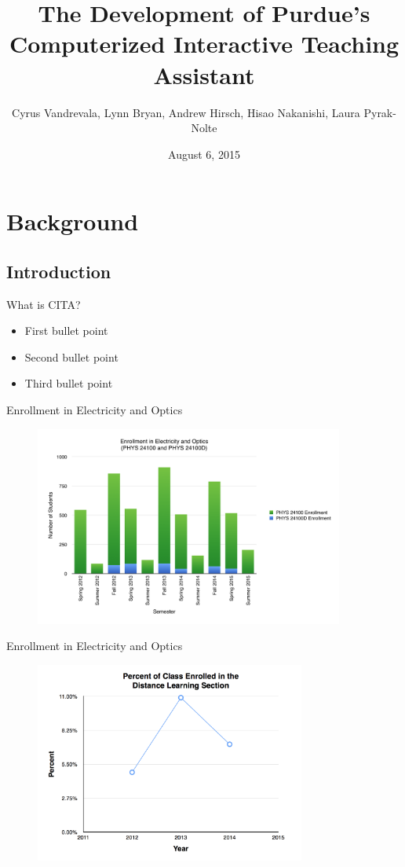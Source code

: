 \documentclass{beamer}
\title{The Development of Purdue's Computerized Interactive Teaching Assistant}
\subtitle{Cyrus Vandrevala, Lynn Bryan, Andrew Hirsch, Hisao Nakanishi, Laura Pyrak-Nolte}
\date{August 6, 2015}
\begin{document}
\begin{frame}
  \titlepage
\end{frame}

\begin{frame}
  \tableofcontents
\end{frame}

\section{Background}

\subsection{Introduction}

\begin{frame}{What is CITA?}
  \begin{itemize}
    \item<1-> First bullet point
    \item<2-> Second bullet point
    \item<3-> Third bullet point
  \end{itemize}
\end{frame}

\begin{frame}{Enrollment in Electricity and Optics}
  \begin{figure}
    \includegraphics[width=4in]{img/chapter1/enrollment}
  \end{figure}
\end{frame}

\begin{frame}{Enrollment in Electricity and Optics}
  \begin{figure}
    \includegraphics[width=3.5in]{img/chapter1/percent}
  \end{figure}
\end{frame}
\end{document}
